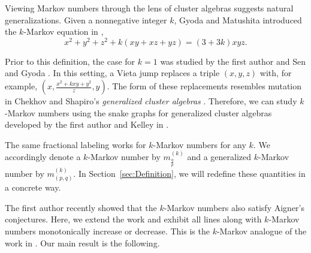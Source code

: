 \documentclass{article}
\theoremstyle{remark}
\newcommand{\fqp}{\frac{q}{p}}
\begin{document}
Viewing Markov numbers through the lens of cluster algebras suggests natural generalizations. Given a nonnegative integer $k$, Gyoda and Matushita introduced the $k$-Markov equation in \cite{GyodaMatsushita}, \begin{equation}
x^2 + y^2 + z^2 + k(xy + xz + yz) = (3+3k)xyz.
\end{equation}

Prior to this definition, the case for $k = 1$ was studied by the first author and Sen \cite{banaian2024generalization} and Gyoda \cite{GyodaOriginal}. In this setting, a Vieta jump replaces a triple $(x,y,z)$ with, for example, $(x,\frac{x^2 + kxy + y^2}{z},y)$. The form of these replacements resembles mutation in Chekhov and Shapiro's \emph{generalized cluster algebras} \cite{chekhov2014teichmuller}. Therefore, we can study $k$-Markov numbers using the snake graphs for generalized cluster algebras developed by the first author and Kelley in \cite{banaian2020snake}.

The same fractional labeling works for $k$-Markov numbers for any $k$. We accordingly denote a $k$-Markov number by $m^{(k)}_{\fqp}$ and a generalized $k$-Markov number by $m^{(k)}_{(p,q)}$. In Section~\ref{sec:Definition}, we will redefine these quantities in a concrete way. 

The first author recently showed that the $k$-Markov numbers also satisfy Aigner's conjectures. Here, we extend the work and exhibit all lines along with $k$-Markov numbers monotonically increase or decrease. This is the $k$-Markov analogue of the work in \cite{HuangMonotonicity}. Our main result is the following.
\end{document}
